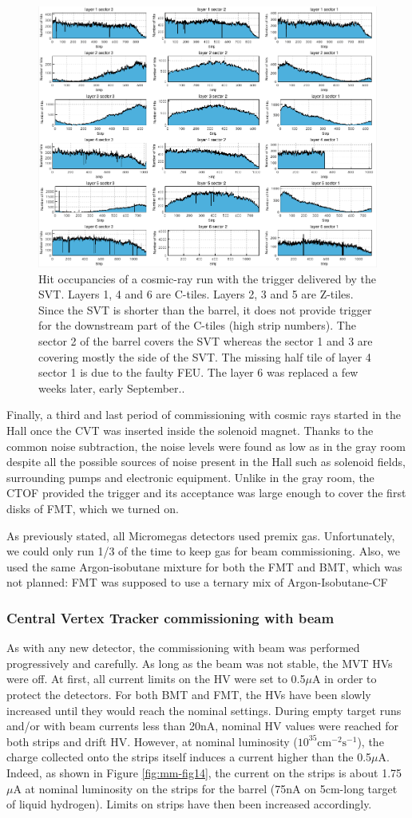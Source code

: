 \begin{figure}[htb]
 \includegraphics[width=.45\textwidth]{images/fig10}
 \caption{Hit occupancies of a cosmic-ray run with the trigger delivered by the SVT. Layers 1, 4 and 6 are C-tiles. Layers 2, 3 and 5 are Z-tiles. Since the SVT is shorter than the barrel, it does not provide trigger for the downstream part of the C-tiles (high strip numbers). The sector 2 of the barrel covers the SVT whereas the sector 1 and 3 are covering mostly the side of the SVT. The missing half tile of layer 4 sector 1 is due to the faulty FEU. The layer 6 was replaced a few weeks later, early September..}
 \label{fig:mm-fig10}
\end{figure}

Finally, a third and last period of commissioning with cosmic rays started in the Hall once the CVT was inserted inside the solenoid magnet. Thanks to the common noise subtraction, the noise levels were found as low as in the gray room despite all the possible sources of noise present in the Hall such as solenoid fields, surrounding pumps and electronic equipment. Unlike in the gray room, the CTOF provided the trigger and its acceptance was large enough to cover the first disks of FMT, which we turned on. 

As previously stated, all Micromegas detectors used premix gas. Unfortunately, we could only run 1/3 of the time to keep gas for beam commissioning. Also, we used the same Argon-isobutane mixture for both the FMT and BMT, which was not planned: FMT was supposed to use a ternary mix of Argon-Isobutane-CF


\subsubsection{Central Vertex Tracker commissioning with beam}

As with any new detector, the commissioning with beam was performed progressively and carefully. As long as the beam was not stable, the MVT HVs were off. At first, all current limits on the HV were set to 0.5$\mu$A in order to protect the detectors. For both BMT and FMT, the HVs have been slowly increased until they would reach the nominal settings. During empty target runs and/or with beam currents less than 20nA, nominal HV values were reached for both strips and drift HV. However, at nominal luminosity ($10^{35}\text{cm}^{-2}\text{s}^{-1}$), the charge collected onto the strips itself induces a current higher than the 0.5$\mu$A. Indeed, as shown in Figure \ref{fig:mm-fig14}, the current on the strips is about 1.75 $\mu$A at nominal luminosity on the strips for the barrel (75nA on 5cm-long target of liquid hydrogen). Limits on strips have then been increased accordingly.

